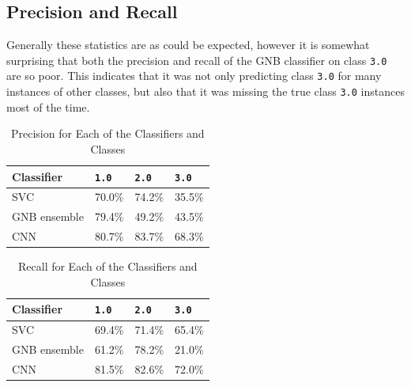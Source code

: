 \documentclass[twocolumn, 11pt]{article}
\begin{document}
\subsection{Precision and Recall}
Generally these statistics are as could be expected, however it is somewhat surprising that both the precision and recall of the GNB classifier on class \verb|3.0| are so poor. This indicates that it was not only predicting class \verb|3.0| for many instances of other classes, but also that it was missing the true class \verb|3.0| instances most of the time.
\begin{table}[!h]
    \centering
    \begin{tabular}{@{}llll@{}}
    \toprule
    Classifier & \verb|1.0| & \verb|2.0| & \verb|3.0| \\ \midrule
    SVC                            & 70.0\%                    & 74.2\%                    & 35.5\%                    \\
    GNB ensemble                   & 79.4\%                    & 49.2\%                    & 43.5\%                    \\
    CNN                            & 80.7\%                    & 83.7\%                    & 68.3\%                    \\ \bottomrule
    \end{tabular}
    \caption{Precision for Each of the Classifiers and Classes}
    \label{tab: precision}
\end{table}
\begin{table}[!h]
    \centering
    \begin{tabular}{@{}llll@{}}
    \toprule
    Classifier & \verb|1.0| & \verb|2.0| & \verb|3.0| \\ \midrule
    SVC          & 69.4\%                    & 71.4\%                    & 65.4\%                    \\
    GNB ensemble & 61.2\%                    & 78.2\%                    & 21.0\%                    \\
    CNN          & 81.5\%                    & 82.6\%                    & 72.0\%                    \\ \bottomrule
    \end{tabular}
    \caption{Recall for Each of the Classifiers and Classes}
    \label{tab: recall}
\end{table}
\end{document}
